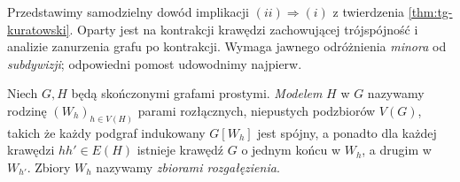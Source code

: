 Przedstawimy samodzielny dowód implikacji
$(ii)\Rightarrow(i)$ z twierdzenia \ref{thm:tg-kuratowski}.
Oparty jest na kontrakcji krawędzi zachowującej
trójspójność i analizie zanurzenia grafu po kontrakcji.
Wymaga jawnego odróżnienia \emph{minora} od
\emph{subdywizji}; odpowiedni pomost udowodnimy najpierw.

\begin{definicja}
\label{def:tg-kuratowski-minor-model}
Niech $G,H$ będą skończonymi grafami prostymi.
\emph{Modelem} $H$ w $G$ nazywamy rodzinę
$(W_h)_{h\in V(H)}$ parami rozłącznych,
niepustych podzbiorów $V(G)$, takich że każdy
podgraf indukowany $G[W_h]$ jest spójny, a ponadto
dla każdej krawędzi $hh'\in E(H)$ istnieje
krawędź $G$ o jednym końcu w $W_h$,
a drugim w $W_{h'}$.
Zbiory $W_h$ nazywamy \emph{zbiorami rozgałęzienia}.
\end{definicja}

